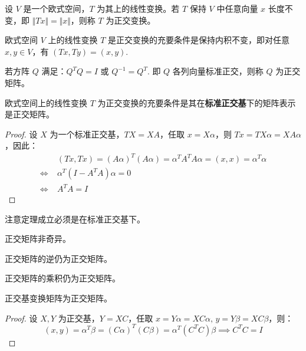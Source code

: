 \begin{definition}[正交变换]
设 $V$ 是一个欧式空间，$T$ 为其上的线性变换。若 $T$ 保持 $V$ 中任意向量 $x$ 长度不变，即 $\Vert Tx\Vert=\Vert x\Vert$，则称 $T$ 为正交变换。
\end{definition}

\begin{theorem}[正交变换的等价定义]
欧式空间 $V$ 上的线性变换 $T$ 是正交变换的充要条件是保持内积不变，即对任意 $x,y\in V$，有 $(Tx,Ty)=(x,y)$.
\end{theorem}

\begin{definition}[正交矩阵]
若方阵 $Q$ 满足：$Q^TQ=I$ 或 $Q^{-1}=Q^T$.  即 $Q$ 各列向量标准正交，则称 $Q$ 为正交矩阵。
\end{definition}

\begin{theorem}[正交变换与正交矩阵]
欧式空间上的线性变换 $T$ 为正交变换的充要条件是其在\textbf{标准正交基}下的矩阵表示是正交矩阵。
\end{theorem}
\begin{proof}
设 $X$ 为一个标准正交基，$TX=XA$，任取 $x=X\alpha$，则 $Tx=TX\alpha=XA\alpha$，因此：
\begin{align*}
    &(Tx,Tx)=(A\alpha)^T(A\alpha)=\alpha^TA^TA\alpha=(x,x)=\alpha^T\alpha\\
    \iff\;&\alpha^T(I-A^TA)\alpha=0\\
    \iff\;& A^TA=I
\end{align*}
\end{proof}
\begin{note}
注意定理成立必须是在标准正交基下。
\end{note}

\begin{property}
正交矩阵非奇异。
\end{property}

\begin{property}
正交矩阵的逆仍为正交矩阵。
\end{property}

\begin{property}
正交矩阵的乘积仍为正交矩阵。
\end{property}

\begin{property}
正交基变换矩阵为正交矩阵。
\end{property}
\begin{proof}
设 $X,Y$ 为正交基，$Y=XC$，任取 $x=Y\alpha=XC\alpha,\,y=Y\beta=XC\beta$，则：
\[
    (x,y)=\alpha^T\beta=(C\alpha)^T(C\beta)=\alpha^T(C^TC)\beta\implies C^TC=I
\]
\end{proof}

